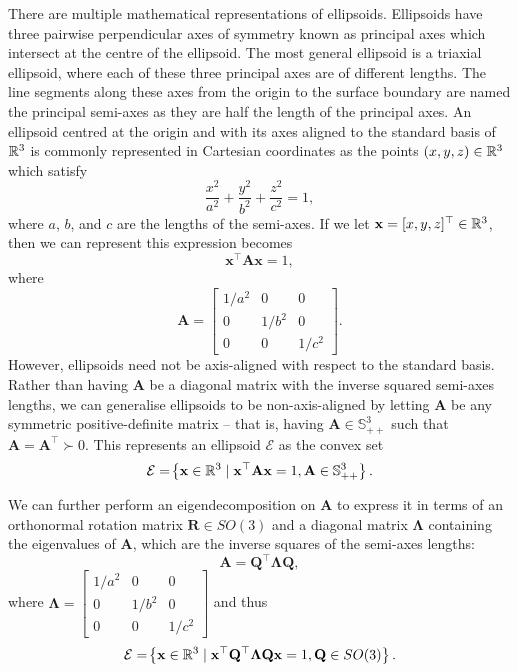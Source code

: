 \documentclass{project-logbook}
\begin{document}
There are multiple mathematical representations of ellipsoids. Ellipsoids have three pairwise perpendicular axes of symmetry known as principal axes which intersect at the centre of the ellipsoid. The most general ellipsoid is a triaxial ellipsoid, where each of these three principal axes are of different lengths. The line segments along these axes from the origin to the surface boundary are named the principal semi-axes as they are half the length of the principal axes. An ellipsoid centred at the origin and with its axes aligned to the standard basis of $\mathbb{R}^3$ is commonly represented in Cartesian coordinates as the points $(x,y,z) \in \mathbb{R}^3$ which satisfy
\begin{equation}
	\frac{x^2}{a^2} + \frac{y^2}{b^2} + \frac{z^2}{c^2} = 1,
\end{equation}
where $a$, $b$, and $c$ are the lengths of the semi-axes. If we let $\mathbf x = [x, y, z]^\top \in \mathbb{R}^3$, then we can represent this expression becomes
\begin{equation}
	\mathbf x^\top \mathbf A \mathbf x = 1,
\end{equation}
where $$\mathbf A = \begin{bmatrix}
	1/a^2 & 0 & 0 \\
	0 & 1/b^2 & 0 \\
	0 & 0 & 1/c^2
\end{bmatrix}.$$
However, ellipsoids need not be axis-aligned with respect to the standard basis. Rather than having $\mathbf A$ be a diagonal matrix with the inverse squared semi-axes lengths, we can generalise ellipsoids to be non-axis-aligned by letting $\mathbf A$ be any symmetric positive-definite matrix -- that is, having $\mathbf A \in \mathbb S^3_{++}$ such that $\mathbf A = \mathbf A^\top \succ 0$. This represents an ellipsoid $\mathcal E$ as the convex set
\begin{equation}
	\mathcal E  = \!\left\{ \mathbf x \in \mathbb{R}^3 \mid \mathbf x^\top \mathbf A \mathbf x = 1, \mathbf A \in \mathbb S^3_{++}  \right\}.
\end{equation}

We can further perform an eigendecomposition on $\mathbf A$ to express it in terms of an orthonormal rotation matrix $\mathbf R \in SO(3)$ and a diagonal matrix $\mathbf \Lambda$ containing the eigenvalues of $\mathbf A$, which are the inverse squares of the semi-axes lengths:
\begin{equation}
	\mathbf A = \mathbf Q^\top \mathbf\Lambda \mathbf Q,
\end{equation}
where $\mathbf \Lambda = \begin{bmatrix}
	1/a^2 & 0 & 0 \\
	0 & 1/b^2 & 0 \\
	0 & 0 & 1/c^2
\end{bmatrix}$
and thus 
\begin{equation}
	\mathcal E  = \!\left\{ \mathbf x \in \mathbb{R}^3 \mid \mathbf x^\top \mathbf Q^\top \mathbf\Lambda \mathbf Q \mathbf x = 1, \mathbf Q \in SO(3) \right\}.
\end{equation}
\end{document}
